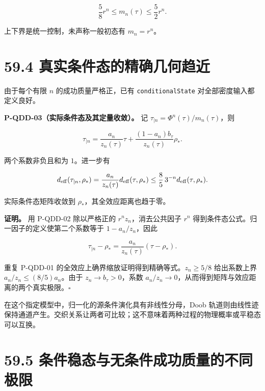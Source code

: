 \documentclass[
  11pt,
  oneside]{book}
\begin{document}
\[
\frac58r^n\le m_n(\tau)\le\frac52r^n.
\]

上下界是统一控制，未声称一般初态有 \(m_n=r^n\)。

\hypertarget{ux771fux5b9eux6761ux4ef6ux6001ux7684ux7cbeux786eux51e0ux4f55ux8d8bux8fd1}{%
\section{59.4
真实条件态的精确几何趋近}\label{ux771fux5b9eux6761ux4ef6ux6001ux7684ux7cbeux786eux51e0ux4f55ux8d8bux8fd1}}

由于每个有限 \(n\) 的成功质量严格正，已有 \texttt{conditionalState}
对全部密度输入都定义良好。

\protect\hypertarget{p-qdd-03}{}{}

\textbf{P-QDD-03（实际条件态及其定量收敛）。} 记
\(\tau_{\mid n}=\Phi^n(\tau)/m_n(\tau)\)，则

\[
\tau_{\mid n}
=\frac{a_n}{z_n(\tau)}\tau
+\frac{(1-a_n)b_\tau}{z_n(\tau)}\rho_*.
\]

两个系数非负且和为 \(1\)。进一步有

\[
d_{\rm eff}(\tau_{\mid n},\rho_*)
=\frac{a_n}{z_n(\tau)}d_{\rm eff}(\tau,\rho_*)
\le\frac85\,3^{-n}d_{\rm eff}(\tau,\rho_*).
\]

实际条件态矩阵收敛到 \(\rho_*\)，其全效应距离也趋于零。

\textbf{证明。} 用 P-QDD-02 除以严格正的 \(r^nz_n\)，消去公共因子
\(r^n\) 得到条件态公式。归一因子的定义使第二个系数等于
\(1-a_n/z_n\)，因此

\[
\tau_{\mid n}-\rho_*
=\frac{a_n}{z_n(\tau)}(\tau-\rho_*).
\]

重复 P-QDD-01 的全效应上确界缩放证明得到精确等式。\(z_n\ge5/8\)
给出系数上界 \(a_n/z_n\le(8/5)a_n\)。由于 \(z_n\to b_\tau>0\)，系数
\(a_n/z_n\to0\)，从而得到矩阵与效应距离的两个真实极限。\(\square\)

在这个指定模型中，归一化的源条件演化具有非线性分母，Doob
轨道则由线性迹保持通道产生。交织关系让两者可比较；这不意味着两种过程的物理概率或平稳态可以互换。

\hypertarget{ux6761ux4ef6ux7a33ux6001ux4e0eux65e0ux6761ux4ef6ux6210ux529fux8d28ux91cfux7684ux4e0dux540cux6781ux9650}{%
\section{59.5
条件稳态与无条件成功质量的不同极限}\label{ux6761ux4ef6ux7a33ux6001ux4e0eux65e0ux6761ux4ef6ux6210ux529fux8d28ux91cfux7684ux4e0dux540cux6781ux9650}}
\end{document}
